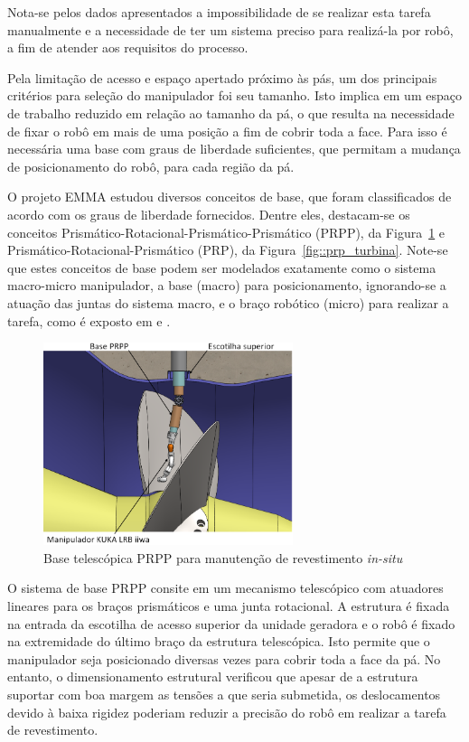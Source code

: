 Nota-se pelos dados apresentados a impossibilidade de se realizar esta tarefa
manualmente e a necessidade de ter um sistema preciso para realizá-la por robô,
a fim de atender aos requisitos do processo.

Pela limitação de acesso e espaço apertado próximo às pás, um dos principais
critérios para seleção do manipulador foi seu tamanho. Isto implica em um
espaço de trabalho reduzido em relação ao tamanho da pá, o que resulta na
necessidade de fixar o robô em mais de uma posição a fim de cobrir
toda a face. Para isso é necessária uma base com graus de liberdade suficientes,
que permitam a mudança de posicionamento do robô, para cada região da pá. 

O projeto EMMA estudou diversos conceitos de base, que foram classificados de
acordo com os graus de liberdade fornecidos. Dentre eles, destacam-se os
conceitos Prismático-Rotacional-Prismático-Prismático (PRPP), da
Figura~\ref{fig::base_telesc_turbina} e Prismático-Rotacional-Prismático (PRP),
da Figura~\ref{fig::prp_turbina}. Note-se que estes conceitos de base podem ser
modelados exatamente como o sistema macro-micro manipulador, a base (macro) para
posicionamento, ignorando-se a atuação das juntas do sistema macro, e o braço
robótico (micro) para realizar a tarefa, como é exposto em
\cite{sharon1993macro} e \cite{lew1994bracing}.

\begin{figure}[h!]
	\centering 
 	\includegraphics[width=0.65\textwidth]{figs/base_telesc_turbina}
 	\caption{Base telescópica PRPP para manutenção de revestimento
 	\textit{in-situ}}
 	\label{fig::base_telesc_turbina}
\end{figure}

O sistema de base PRPP consite em um mecanismo telescópico com atuadores
lineares para os braços prismáticos e uma junta rotacional. A estrutura é fixada
na entrada da escotilha de acesso superior da unidade geradora e o robô é fixado
na extremidade do último braço da estrutura telescópica. Isto permite que o
manipulador seja posicionado diversas vezes para cobrir toda a face da pá. No
entanto, o dimensionamento estrutural verificou que apesar de a estrutura
suportar com boa margem as tensões a que seria submetida, os deslocamentos
devido à baixa rigidez poderiam reduzir a precisão do robô em realizar a tarefa
de revestimento.

